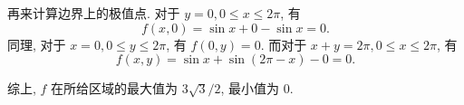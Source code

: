 \documentclass{article}
\begin{document}
\begin{solution}
	再来计算边界上的极值点. 对于 $y = 0, 0 \le x \le 2\pi$, 有
	\[ f(x,0) = \sin x + 0 - \sin x = 0. \]
	同理, 对于 $x = 0, 0 \le y \le 2\pi$, 有 $f(0,y) = 0$. 而对于 $x+y = 2 \pi, 0 \le x \le 2\pi$, 有
	\[ f(x,y) = \sin x + \sin (2\pi - x) - 0 = 0. \]

	综上, $f$ 在所给区域的最大值为 $3\sqrt{3}/2$, 最小值为 $0$. 
\end{solution}
\end{document}

